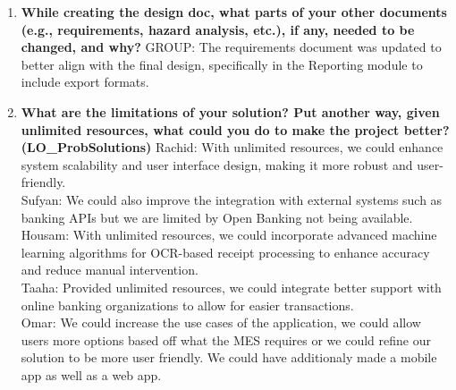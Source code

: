 \documentclass[12pt, titlepage]{article}
\begin{document}
\begin{enumerate}
    \item \textbf{While creating the design doc, what parts of your other documents (e.g., requirements, hazard analysis, etc.), if any, needed to be changed, and why?}  
    \newline
    GROUP: The requirements document was updated to better align with the final design, specifically in the Reporting module to include export formats.
  
    \item \textbf{What are the limitations of your solution? Put another way, given unlimited resources, what could you do to make the project better? (LO\_ProbSolutions)}  
    \newline
    Rachid: With unlimited resources, we could enhance system scalability and user interface design, making it more robust and user-friendly. \\
    Sufyan: We could also improve the integration with external systems such as banking APIs but we are limited by Open Banking not being available. \\
    Housam: With unlimited resources, we could incorporate advanced machine learning algorithms for OCR-based receipt processing to enhance accuracy and reduce manual intervention. \\
    Taaha: Provided unlimited resources, we could integrate better support with online banking organizations to allow for easier transactions. \\
    Omar: We could increase the use cases of the application, we could allow users more options based off what the MES requires or we could refine our solution to be more user friendly. We could have additionaly made a mobile app as well as a web app. \\
  

\end{enumerate}
\end{document}
